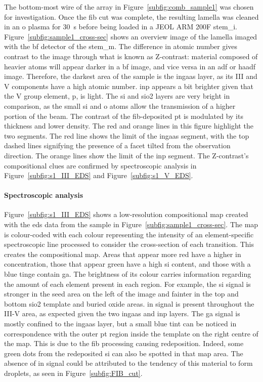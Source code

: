 The bottom-most wire of the array in Figure~\ref{subfig:comb_sample1} was chosen for investigation. Once the \acs{fib} cut was complete, the resulting lamella was cleaned in an \acl{o} plasma for \qty{30}{s} before being loaded in a JEOL ARM 200F \acl{stem_i}. Figure~\ref{subfig:sample1_cross-sec} shows an overview image of the lamella imaged with the \acf{bf} detector of the \acs{stem_m}. The difference in atomic number gives contrast to the image through what is known as Z-contrast: material composed of heavier atoms will appear darker in a \acs{bf} image, and vice versa in an \acf{adf} or \acf{haadf} image. Therefore, the darkest area of the sample is the \acs{ingaas} layer, as its III and V components have a high atomic number. \acs{inp} appears a bit brighter given that the V group element, \acl{p}, is light. The \acl{si} and \acs{sio2} layers are very bright in comparison, as the small \acl{si} and \acl{o} atoms allow the transmission of a higher portion of the beam. The contrast of the \acs{fib}-deposited \acl{pt} is modulated by its thickness and lower density. The red and orange lines in this figure highlight the two segments. The red line shows the limit of the \acs{ingaas} segment, with the top dashed lines signifying the presence of a facet tilted from the observation direction. The orange lines show the limit of the \acs{inp} segment. The Z-contrast's compositional clues are confirmed by spectroscopic analysis in Figure~\ref{subfig:s1_III_EDS} and Figure~\ref{subfig:s1_V_EDS}. 

\paragraph{Spectroscopic analysis}Figure~\ref{subfig:s1_III_EDS} shows a low-resolution compositional map created with the \acf{eds} data from the sample in Figure~\ref{subfig:sample1_cross-sec}. The map is colour-coded with each colour representing the intensity of an element-specific spectroscopic line processed to consider the cross-section of each transition. This creates the compositional map. Areas that appear more red have a higher \acl{in} concentration, those that appear green have a high \acl{si} content, and those with a blue tinge contain \acl{ga}. The brightness of its colour carries information regarding the amount of each element present in each region. For example, the \acl{si} signal is stronger in the seed area on the left of the image and fainter in the top and bottom \acs{sio2} template and buried oxide areas. \Acl{in} signal is present throughout the III-V area, as expected given the two \acs{ingaas} and \acs{inp} layers. The \acl{ga} signal is mostly confined to the \acs{ingaas} layer, but a small blue tint can be noticed in correspondence with the outer \acl{pt} region inside the template on the right centre of the map. This is due to the \acs{fib} processing causing redeposition. Indeed, some green dots from the redeposited \acl{si} can also be spotted in that map area. The absence of \acl{in} signal could be attributed to the tendency of this material to form droplets, as seen in Figure~\ref{subfig:FIB_cut}.


